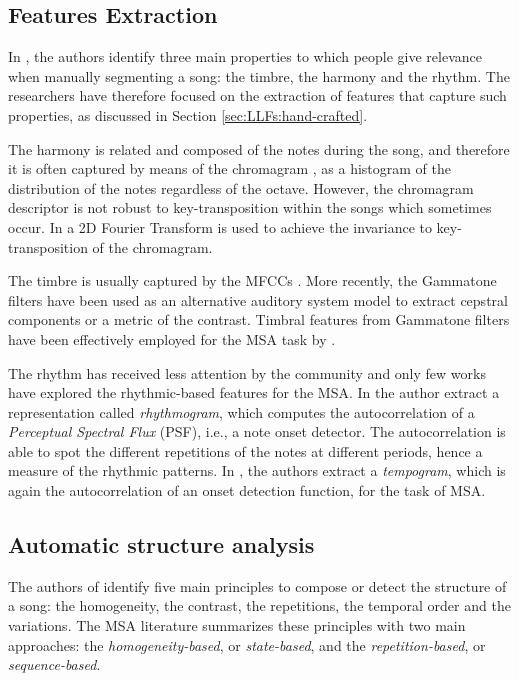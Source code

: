 \subsection{Features Extraction}
In \cite{bruderer2006structural}, the authors identify three main properties to which people give relevance when manually segmenting a song: the timbre, the harmony and the rhythm. The researchers have therefore focused on the extraction of features that capture such properties, as discussed in Section \ref{sec:LLFs:hand-crafted}.

The harmony is related and composed of the notes during the song, and therefore it is often captured by means of the chromagram \cite{NietoCNMF,Nieto2D,Jensen2007}, as a histogram of the distribution of the notes regardless of the octave. However, the chromagram descriptor is not robust to key-transposition within the songs which sometimes occur. In \cite{Nieto2D} a 2D Fourier Transform is used to achieve the invariance to key-transposition of the chromagram.

The timbre is usually captured by the MFCCs \cite{itoh2008automatic,cooper2002,dubnov2008unified}. More recently, the Gammatone filters have been used as an alternative  auditory system model to extract cepstral components or a metric of the contrast. Timbral features from Gammatone filters have been effectively employed for the MSA task by \cite{tian2016}.

The rhythm has received less attention by the community and only few works have explored the rhythmic-based features for the MSA. In \cite{Jensen2007} the author extract a representation called \textit{rhythmogram}, which computes the autocorrelation of a \textit{Perceptual Spectral Flux} (PSF), i.e., a note onset detector. The autocorrelation is able to spot the different repetitions of the notes at different periods, hence a measure of the rhythmic patterns. In \cite{Tian2015}, the authors extract a \textit{tempogram}, which is again the autocorrelation of an onset detection function, for the task of MSA.


\subsection{Automatic structure analysis}
The authors of \cite{paulus2010state} identify five main principles to compose or detect the structure of a song: the homogeneity, the contrast, the repetitions, the temporal order and the variations. The MSA literature summarizes these principles with two main approaches: the \textit{homogeneity-based}, or \textit{state-based}, and the \textit{repetition-based}, or \textit{sequence-based}. 

